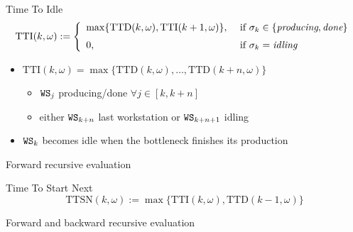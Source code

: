     \begin{frame}{Time To Idle}
      \begin{equation*}
        \mbox{TTI}(k,\omega) := \left\{ \begin{array}{ll}
          \max\{\mbox{TTD}(k,\omega),\mbox{TTI}(k+1,\omega)\}, & \mbox{ if } \sigma_k\in\{\mbox{\em producing}, \mbox{\em done}\}
          \medskip\\
          0, & \mbox{ if } \sigma_k=\mbox{\em idling}
        \end{array} \right.
        \label{eq:tti}
      \end{equation*}
      
      \begin{itemize}
        \item $\mbox{TTI}(k,\omega)=\max\{ \mbox{TTD}(k,\omega), \ldots, \mbox{TTD}(k+n,\omega) \}$
        \begin{itemize}
          \item $\mathtt{WS}_j$ producing/done $\forall j \in [k,k+n]$
          \item either $\mathtt{WS}_{k+n}$ last workstation or $\mathtt{WS}_{k+n+1}$ idling
        \end{itemize}
        \item $\mathtt{WS}_k$ becomes idle when the bottleneck finishes its production
      \end{itemize}
      
      \begin{center}\hspace{-1.5cm}\scalebox{0.8}{}\end{center}
      
      Forward recursive evaluation
    \end{frame}
    
    \begin{frame}{Time To Start Next}
      \begin{equation*}
        \mbox{TTSN}(k,\omega) := \max\{ \mbox{TTI}(k,\omega), \mbox{TTD}(k-1,\omega) \}
        \label{eq:ttn}
      \end{equation*}
      
      \vspace{1em}
      \begin{center}\hspace{-1.5cm}\scalebox{0.8}{}\end{center}
      
      Forward and backward recursive evaluation
    \end{frame}
    
